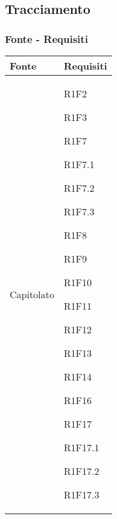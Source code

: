 \subsection{Tracciamento}
\subsubsection{Fonte - Requisiti}
\begin{center}
	\begin{longtable}{|p{44mm}|p{22mm}|}
		\hline
		\rowcolor{lighter-grayer}
		\textbf{Fonte} &  \textbf{Requisiti}  \\
		\hline
		\endhead
		
		

Capitolato &

R1F2 \newline

R1F3 \newline

R1F7 \newline

R1F7.1 \newline

R1F7.2 \newline

R1F7.3 \newline

R1F8 \newline

R1F9 \newline

R1F10 \newline

R1F11 \newline

R1F12 \newline

R1F13 \newline

R1F14 \newline

R1F16 \newline

R1F17 \newline

R1F17.1 \newline

R1F17.2 \newline

R1F17.3 \newline


\end{longtable}
\end{center}

